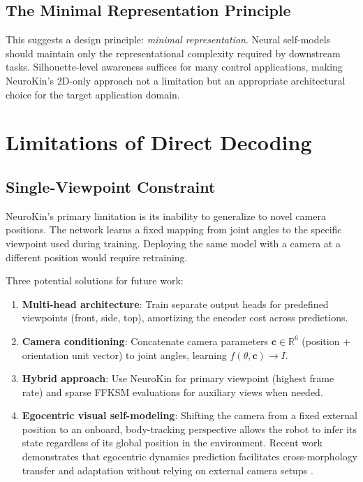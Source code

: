\documentclass[12pt,a4paper,oneside]{report}
\begin{document}
\subsection{The Minimal Representation Principle}
\label{subsec:the_minimal_representation_principle}

This suggests a design principle: \textit{minimal representation}. Neural self-models should maintain only the representational complexity required by downstream tasks. Silhouette-level awareness suffices for many control applications, making NeuroKin's 2D-only approach not a limitation but an appropriate architectural choice for the target application domain.

\section{Limitations of Direct Decoding}

\subsection{Single-Viewpoint Constraint}
\label{subsec:single_viewpoint_constraint}

NeuroKin's primary limitation is its inability to generalize to novel camera positions. The network learns a fixed mapping from joint angles to the specific viewpoint used during training. Deploying the same model with a camera at a different position would require retraining.

Three potential solutions for future work:

\begin{enumerate}
    \item \textbf{Multi-head architecture}: Train separate output heads for predefined viewpoints (front, side, top), amortizing the encoder cost across predictions.
    \item \textbf{Camera conditioning}: Concatenate camera parameters $\mathbf{c} \in \mathbb{R}^6$ (position + orientation unit vector) to joint angles, learning $f(\theta, \mathbf{c}) \rightarrow I$.
    \item \textbf{Hybrid approach}: Use NeuroKin for primary viewpoint (highest frame rate) and sparse FFKSM evaluations for auxiliary views when needed.
    \item \textbf{Egocentric visual self-modeling}: Shifting the camera from a fixed external position to an onboard, body-tracking perspective allows the robot to infer its state regardless of its global position in the environment. Recent work demonstrates that egocentric dynamics prediction facilitates cross-morphology transfer and adaptation without relying on external camera setups \cite{hu2024egocentric}.
\end{enumerate}
\end{document}
